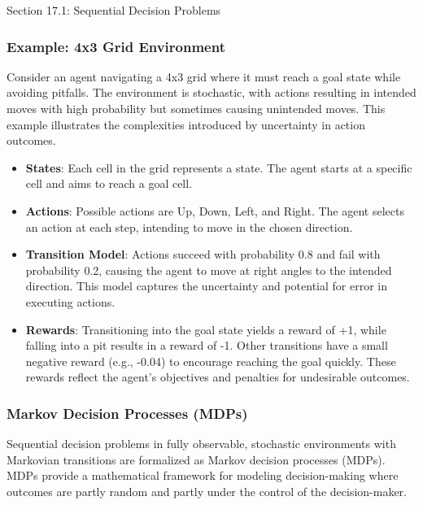 \begin{notes}{Section 17.1: Sequential Decision Problems}
\begin{highlight}
    \end{highlight}
    
    \subsubsection*{Example: 4x3 Grid Environment}
    
    Consider an agent navigating a 4x3 grid where it must reach a goal state while avoiding pitfalls. The environment is stochastic, with actions resulting in intended moves with high probability but 
    sometimes causing unintended moves. This example illustrates the complexities introduced by uncertainty in action outcomes.
    
    \begin{highlight}
    
        \begin{itemize}
            \item \textbf{States}: Each cell in the grid represents a state. The agent starts at a specific cell and aims to reach a goal cell.
            \item \textbf{Actions}: Possible actions are Up, Down, Left, and Right. The agent selects an action at each step, intending to move in the chosen direction.
            \item \textbf{Transition Model}: Actions succeed with probability 0.8 and fail with probability 0.2, causing the agent to move at right angles to the intended direction. This model captures 
            the uncertainty and potential for error in executing actions.
            \item \textbf{Rewards}: Transitioning into the goal state yields a reward of +1, while falling into a pit results in a reward of -1. Other transitions have a small negative reward (e.g., -0.04) 
            to encourage reaching the goal quickly. These rewards reflect the agent's objectives and penalties for undesirable outcomes.
        \end{itemize}
    
    \end{highlight}
    
    \subsubsection*{Markov Decision Processes (MDPs)}
    
    Sequential decision problems in fully observable, stochastic environments with Markovian transitions are formalized as Markov decision processes (MDPs). MDPs provide a mathematical framework for 
    modeling decision-making where outcomes are partly random and partly under the control of the decision-maker.
    

\end{notes}
